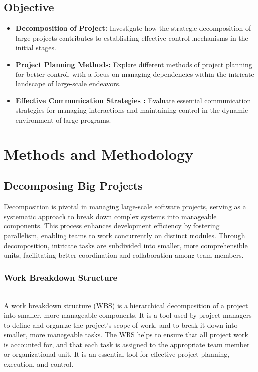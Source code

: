 \documentclass[runningheads]{llncs}
\begin{document}
\subsection{Objective}

\begin{itemize}[label=$\bullet$]
    \item \textbf{Decomposition of Project:}
    Investigate how the strategic decomposition of large projects contributes to establishing effective control mechanisms in the initial stages.
    
    \item \textbf{Project Planning Methods:}
    Explore different methods of project planning for better control, with a focus on managing dependencies within the intricate landscape of large-scale endeavors.

    \item \textbf{Effective Communication Strategies :}
    Evaluate essential communication strategies for managing interactions and maintaining control in the dynamic environment of large programs.
\end{itemize}


\section{Methods and Methodology}


\subsection{Decomposing Big Projects}
Decomposition is pivotal in managing large-scale software projects, serving as a systematic approach to break down complex systems into manageable components. This process enhances development efficiency by fostering parallelism, enabling teams to work concurrently on distinct modules. Through decomposition, intricate tasks are subdivided into smaller, more comprehensible units, facilitating better coordination and collaboration among team members.


\subsubsection{Work Breakdown Structure}\mbox{}\\
A work breakdown structure (WBS) is a hierarchical decomposition of a project into smaller, more manageable components. It is a tool used by project managers to define and organize the project's scope of work, and to break it down into smaller, more manageable tasks. The WBS helps to ensure that all project work is accounted for, and that each task is assigned to the appropriate team member or organizational unit. It is an essential tool for effective project planning, execution, and control\cite{wbs}.
\end{document}
